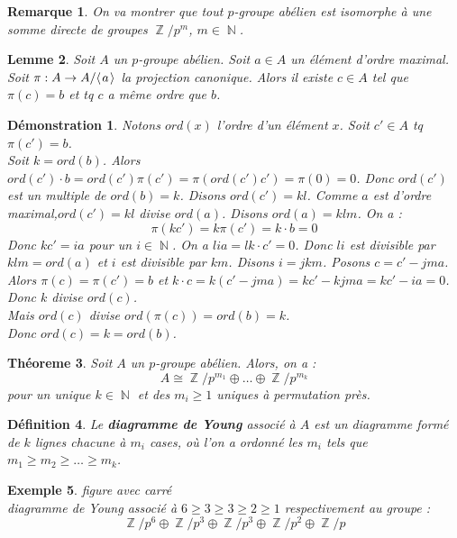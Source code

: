 \documentclass[a4paper, oneside]{report}
\theoremstyle{break}
\newtheorem{thm}{Théoreme}[section] %
\newtheorem{defi}[thm]{Définition}
\newtheorem{lemme}[thm]{Lemme}
\newtheorem{exem}[thm]{Exemple}
\newtheorem{remar}[thm]{Remarque}
\newtheorem*{demo}{Démonstration}
\DeclareMathOperator{\N}{\mathbb{N}}
\DeclareMathOperator{\Z}{\mathbb{Z}}
\newcommand{\pro}[1]{\langle\hspace{0.1em}#1\hspace{0.1em}\rangle}
\newcommand{\gen}{\pro}
\begin{document}
\begin{remar}
On va montrer que tout $p$-groupe abélien est isomorphe à une somme directe de groupes $\Z/p^m$, $m\in \N$.
\end{remar}

\begin{lemme}
Soit $A$ un $p$-groupe abélien. Soit $a \in A$ un élément d'ordre maximal. Soit $\pi : A\rightarrow A/\gen{a}$ la
projection canonique. Alors il existe $c\in A$ tel que $\pi(c)=b$ et tq $c$ a même ordre que $b$.
\end{lemme}

\begin{demo}
Notons $ord(x)$ l'ordre d'un élément $x$. Soit $c' \in A$ tq $\pi(c')=b$.\\
Soit $k= ord(b)$. Alors $ord(c')\cdot b = ord(c')\pi(c')=\pi(ord(c')c')=\pi(0)=0$. Donc $ord(c')$ est un multiple de $ord(b)=k$. Disons $ord(c')=kl$. Comme $a$ est d'ordre maximal,$ord(c')=kl$ divise $ord(a)$. Disons $ord(a)=klm$. On a :
$$\pi(kc')=k\pi(c')=k\cdot b =0$$
Donc $kc' = ia$ pour un $i\in \N$. On a $lia = lk\cdot c'=0$. Donc $li$ est divisible par $klm=ord(a)$ et $i$ est divisible par $km$. Disons $i=jkm$. Posons $c=c'-jma$.\\
Alors $\pi(c)=\pi(c')=b$ et $k\cdot c=k(c'-jma)=kc'-kjma=kc'-ia=0$. Donc $k$ divise $ord(c)$.\\
Mais $ord(c)$ divise $ord(\pi(c))=ord(b)=k$.\\
Donc $ord(c)=k=ord(b)$.
\end{demo}

\begin{thm}
Soit $A$ un $p$-groupe abélien. Alors, on a :
$$A\cong \Z/p^{m_1} \oplus \ldots \oplus \Z/p^{m_k}$$
pour un unique $k\in \N$ et des $m_i \geq 1$ uniques à permutation près.
\end{thm}

\begin{defi}
Le \textbf{diagramme de Young} associé à $A$ est un diagramme formé de $k$ lignes chacune à $m_i$ cases, où l'on a ordonné les $m_i$ tels que $m_1 \geq m_2 \geq \ldots \geq m_k$.
\end{defi}

\begin{exem}
figure avec carré\\

diagramme de Young associé à $6\geq 3 \geq 3 \geq 2 \geq 1$ respectivement au groupe :
$$ \Z/p^{6} \oplus \Z/p^{3} \oplus \Z/p^{3} \oplus \Z/p^{2} \oplus \Z/p$$
\end{exem}
\end{document}
